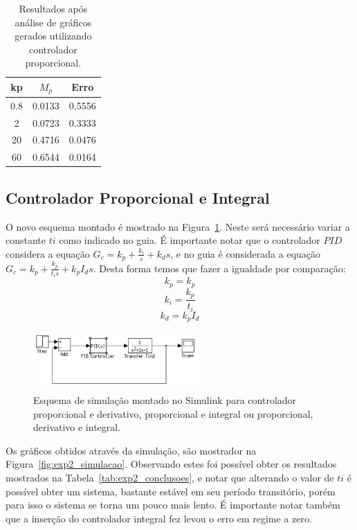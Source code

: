 \documentclass[a4paper]{article}
\begin{document}
\begin{table}[h]
\centering
\begin{tabular}{c c c}
   \toprule
   kp & $M_p$   &  Erro \\ \midrule
   0.8 & 0.0133 & 0.5556 \\
   2   & 0.0723 & 0.3333 \\
   20  & 0.4716 & 0.0476 \\
   60  & 0.6544 & 0.0164 \\
   \bottomrule
\end{tabular}
\caption{Resultados após análise de gráficos gerados utilizando controlador proporcional.}
\label{tab:exp1_conclusoes}
\end{table}

\subsection{Controlador Proporcional e Integral}\label{sec:pi}
O novo esquema montado é mostrado na Figura~\ref{fig:exp2}. Neste será necessário
variar a constante $ti$ como indicado no guia. É importante notar que o controlador
$PID$ considera a equação $G_c=k_p+\frac{k_i}{s}+k_ds$, e no guia é considerada a
equação $G_c=k_p+\frac{k_p}{t_is}+k_pI_ds$. Desta forma temos que fazer a igualdade
por comparação:
$$k_p=k_p$$
$$k_i=\frac{k_p}{t_i}$$
$$k_d=k_pI_d$$

\begin{figure}[h]
   \centering
   \includegraphics[width=2.5in]{exp2}
   \caption{Esquema de simulação montado no Simulink para controlador proporcional e derivativo,
      proporcional e integral ou proporcional, derivativo e integral.}
   \label{fig:exp2}
\end{figure}

Os gráficos obtidos através da simulação, são mostrador na Figura~\ref{fig:exp2_simulacao}.
Observando estes foi possível obter os resultados mostrados na Tabela~\ref{tab:exp2_conclusoes},
e notar que alterando o valor de $ti$ é possível obter um sistema, bastante estável em seu
período transitório, porém para isso o sistema se torna um pouco mais lento. É importante
notar também que a inserção do controlador integral fez levou o erro em regime a zero.
\end{document}
